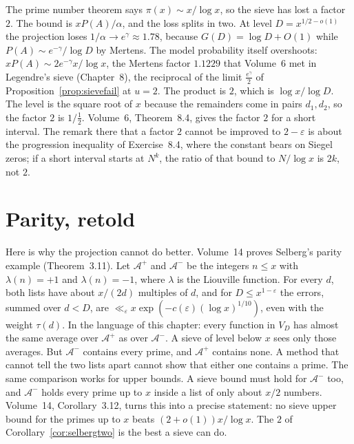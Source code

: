 The prime number theorem says $\pi(x)\sim x/\log x$, so the sieve has lost a factor $2$. The bound is $xP(A)/\alpha$, and the loss splits in two. At level $D=x^{1/2-o(1)}$ the projection loses $1/\alpha\to e^\gamma\approx1.78$, because $G(D)=\log D+O(1)$ while $P(A)\sim e^{-\gamma}/\log D$ by Mertens. The model probability itself overshoots: $xP(A)\sim2e^{-\gamma}x/\log x$, the Mertens factor $1.1229$ that Volume~6 met in Legendre's sieve (Chapter~8), the reciprocal of the limit $\frac{e^\gamma}2$ of Proposition~\ref{prop:sievefail} at $u=2$. The product is $2$, which is $\log x/\log D$. The level is the square root of $x$ because the remainders come in pairs $d_1,d_2$, so the factor $2$ is $1\big/\tfrac12$. Volume~6, Theorem~8.4, gives the factor $2$ for a short interval. The remark there that a factor $2$ cannot be improved to $2-\varepsilon$ is about the progression inequality of Exercise~8.4, where the constant bears on Siegel zeros; if a short interval starts at $N^k$, the ratio of that bound to $N/\log x$ is $2k$, not $2$.

\section{Parity, retold}

Here is why the projection cannot do better. Volume~14 proves Selberg's parity example (Theorem~3.11). Let $\mathcal A^+$ and $\mathcal A^-$ be the integers $n\le x$ with $\lambda(n)=+1$ and $\lambda(n)=-1$, where $\lambda$ is the Liouville function. For every $d$, both lists have about $x/(2d)$ multiples of $d$, and for $D\le x^{1-\varepsilon}$ the errors, summed over $d<D$, are $\ll_\varepsilon x\exp(-c(\varepsilon)(\log x)^{1/10})$, even with the weight $\tau(d)$. In the language of this chapter: every function in $V_D$ has almost the same average over $\mathcal A^+$ as over $\mathcal A^-$. A sieve of level below $x$ sees only those averages. But $\mathcal A^-$ contains every prime, and $\mathcal A^+$ contains none. A method that cannot tell the two lists apart cannot show that either one contains a prime. The same comparison works for upper bounds. A sieve bound must hold for $\mathcal A^-$ too, and $\mathcal A^-$ holds every prime up to $x$ inside a list of only about $x/2$ numbers. Volume~14, Corollary~3.12, turns this into a precise statement: no sieve upper bound for the primes up to $x$ beats $(2+o(1))x/\log x$. The $2$ of Corollary~\ref{cor:selbergtwo} is the best a sieve can do.

